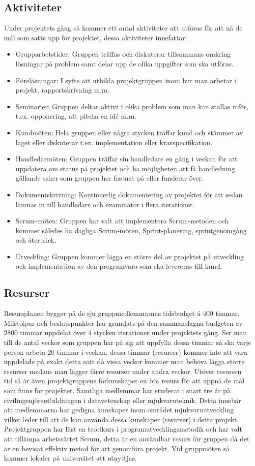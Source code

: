\documentclass[a4paper,10pt]{article}
\begin{document}
\subsection{Aktiviteter}
Under projektets gång så kommer ett antal aktiviteter att utföras för att nå de mål som satts upp för projektet, dessa aktiviteter innefattar:
\begin{itemize}
\item Grupparbetstider: Gruppen träffas och diskuterar tillsammans omkring lösningar på problem samt delar upp de olika uppgifter som ska utföras.
\item Föreläsningar: I syfte att utbilda projektgruppen inom hur man arbetar i projekt, rapportskrivning m.m.
\item Seminarier: Gruppen deltar aktivt i olika problem som man kan ställas inför, t.ex. opponering, att pitcha en idé m.m.
\item Kundmöten: Hela gruppen eller några stycken träffar kund och stämmer av läget eller diskuterar t.ex. implementation eller kravspecifikation.
\item Handledarmöten: Gruppen träffar sin handledare en gång i veckan för att uppdatera om status på projektet och ha möjligheten att få handledning gällande saker som gruppen har fastnat på eller funderar över.
\item Dokumentskrivning: Kontinuerlig dokumentering av projektet för att sedan lämnas in till handledare och examinator i flera iterationer.
\item Scrum-möten: Gruppen har valt att implementera Scrum-metoden och kommer således ha dagliga Scrum-möten, Sprint-planering, sprintgenomgång och återblick.
\item Utveckling: Gruppen kommer lägga en större del av projektet på utveckling och implementation av den programvara som ska levereras till kund.
\end{itemize}
\subsection{Resurser}
Resursplanen bygger på de sju gruppmedlemmarnas tidsbudget á 400 timmar. Milstolpar och beslutspunkter har grundats på den sammanslagna budgeten av 2800 timmar uppdelat över 4 stycken iterationer under projektets gång. Ser man till de antal veckor som gruppen har på sig att uppfylla dessa timmar så ska varje person arbeta 20 timmar i veckan, dessa timmar (resurser) kommer inte att vara uppdelade på exakt detta sätt då vissa veckor kommer man behöva lägga större resurser medans man lägger färre resurser under andra veckor.
Utöver resursen tid så är även projektgruppens förkunskaper en bra resurs för att uppnå de mål som finns för projektet. Samtliga medlemmar har studerat i snart tre år på civilingenjörsutbildningen i datavetenskap eller mjukvaruteknik. Detta innebär att medlemmarna har gedigna kunskaper inom området mjukvaruutveckling vilket leder till att de kan använda dessa kunskaper (resurser) i detta projekt.
Projektgruppen har läst en teorikurs i programutvecklingsmetodik och har valt att tillämpa arbetssättet Scrum, detta är en användbar resurs för gruppen då det är en bevisat effektiv metod för att genomföra projekt.
Vid gruppmöten så kommer lokaler på universitet att utnyttjas.
\end{document}
